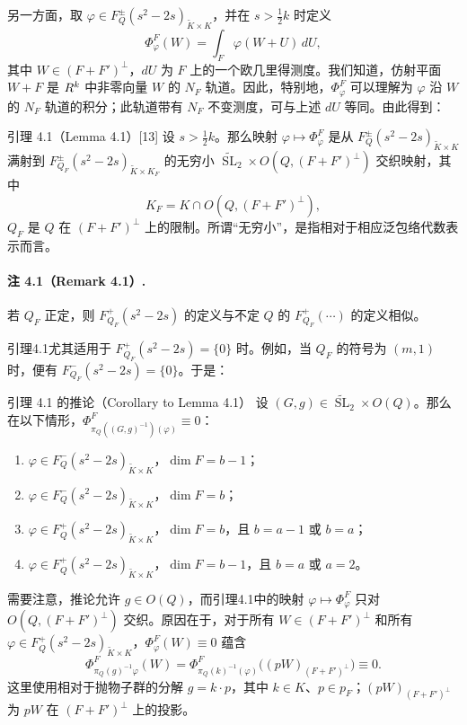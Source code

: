 另一方面，取 $\varphi\in F_Q^\pm(s^2-2s)_{\widetilde K\times K}$，并在 $s>\tfrac12k$ 时定义
\begin{equation}
 \Phi_\varphi^F(W)=\int_F\varphi(W+U)\,dU,\tag{4-2}
\end{equation}
其中 $W\in(F+F')^\perp$，$dU$ 为 $F$ 上的一个欧几里得测度。我们知道，仿射平面 $W+F$ 是 $R^k$ 中非零向量 $W$ 的 $N_F$ 轨道。因此，特别地，$\Phi_\varphi^F$ 可以理解为 $\varphi$ 沿 $W$ 的 $N_F$ 轨道的积分；此轨道带有 $N_F$ 不变测度，可与上述 $dU$ 等同。由此得到：
\begin{originaltheorem}{引理 4.1（Lemma 4.1）[13]}
设 $s>\tfrac12k$。那么映射 $\varphi\mapsto\Phi_\varphi^F$ 是从
$F_Q^\pm(s^2-2s)_{\widetilde K\times K}$ 满射到
$F_{Q_F}^\pm(s^2-2s)_{\widetilde K\times K_F}$ 的无穷小
$\widetilde{\operatorname{SL}}_2\times O(Q,(F+F')^\perp)$ 交织映射，其中
\[
 K_F=K\cap O(Q,(F+F')^\perp),
\]
$Q_F$ 是 $Q$ 在 $(F+F')^\perp$ 上的限制。所谓“无穷小”，是指相对于相应泛包络代数表示而言。
\end{originaltheorem}

\paragraph*{注 4.1（Remark 4.1）.}
若 $Q_F$ 正定，则 $F_{Q_F}^+(s^2-2s)$ 的定义与不定 $Q$ 的 $F_{Q_F}^+(\cdots)$ 的定义相似。

引理4.1尤其适用于 $F_{Q_F}^+(s^2-2s)=\{0\}$ 时。例如，当 $Q_F$ 的符号为 $(m,1)$ 时，便有 $F_{Q_F}^-(s^2-2s)=\{0\}$。于是：
\begin{originaltheorem}{引理 4.1 的推论（Corollary to Lemma 4.1）}
设 $(G,g)\in\widetilde{\operatorname{SL}}_2\times O(Q)$。那么在以下情形，$\Phi_{\pi_Q((G,g)^{-1})(\varphi)}^F\equiv0$：
\begin{enumerate}
\item[(a)] $\varphi\in F_Q^-(s^2-2s)_{\widetilde K\times K}$，$\dim F=b-1$；
\item[(b)] $\varphi\in F_Q^-(s^2-2s)_{\widetilde K\times K}$，$\dim F=b$；
\item[(c)] $\varphi\in F_Q^+(s^2-2s)_{\widetilde K\times K}$，$\dim F=b$，且 $b=a-1$ 或 $b=a$；
\item[(d)] $\varphi\in F_Q^+(s^2-2s)_{\widetilde K\times K}$，$\dim F=b-1$，且 $b=a$ 或 $a=2$。
\end{enumerate}
\end{originaltheorem}

需要注意，推论允许 $g\in O(Q)$，而引理4.1中的映射 $\varphi\mapsto\Phi_\varphi^F$ 只对 $O(Q,(F+F')^\perp)$ 交织。原因在于，对于所有 $W\in(F+F')^\perp$ 和所有 $\varphi\in F_Q^+(s^2-2s)_{\widetilde K\times K}$，$\Phi_\varphi^F(W)\equiv0$ 蕴含
\[
 \Phi_{\pi_Q(g)^{-1}\varphi}^F(W)
 =\Phi_{\pi_Q(k)^{-1}(\varphi)}^F\bigl((pW)_{(F+F')^\perp}\bigr)\equiv0.
\]
这里使用相对于抛物子群的分解 $g=k\cdot p$，其中 $k\in K$、$p\in p_F$；$(pW)_{(F+F')^\perp}$ 为 $pW$ 在 $(F+F')^\perp$ 上的投影。

